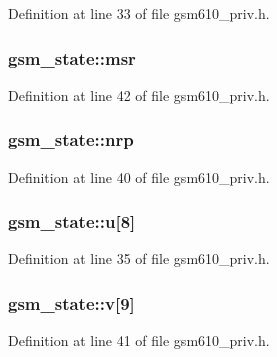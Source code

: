 Definition at line 33 of file gsm610\+\_\+priv.\+h.

\subsubsection[{\texorpdfstring{msr}{msr}}]{ gsm\+\_\+state\+::msr}\hypertarget{structgsm__state_aef7fbc60429ef7f577f5f95a2ddad9fa}{}\label{structgsm__state_aef7fbc60429ef7f577f5f95a2ddad9fa}


Definition at line 42 of file gsm610\+\_\+priv.\+h.

\subsubsection[{\texorpdfstring{nrp}{nrp}}]{ gsm\+\_\+state\+::nrp}\hypertarget{structgsm__state_a4e458d0429f05487e7986942703b4e34}{}\label{structgsm__state_a4e458d0429f05487e7986942703b4e34}


Definition at line 40 of file gsm610\+\_\+priv.\+h.

\subsubsection[{\texorpdfstring{u}{u}}]{ gsm\+\_\+state\+::u\mbox{[}8\mbox{]}}\hypertarget{structgsm__state_ad6c57d87a63556ac2e397312cc73135e}{}\label{structgsm__state_ad6c57d87a63556ac2e397312cc73135e}


Definition at line 35 of file gsm610\+\_\+priv.\+h.

\subsubsection[{\texorpdfstring{v}{v}}]{ gsm\+\_\+state\+::v\mbox{[}9\mbox{]}}\hypertarget{structgsm__state_a0e47cfb760e2c6da550ff07ca9e32b38}{}\label{structgsm__state_a0e47cfb760e2c6da550ff07ca9e32b38}


Definition at line 41 of file gsm610\+\_\+priv.\+h.


